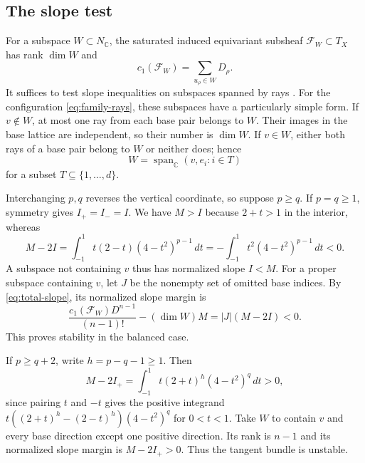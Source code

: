\documentclass[11pt]{amsart}
\theoremstyle{definition}
\theoremstyle{remark}
\newcommand{\CC}{\mathbb C}
\newcommand{\Span}{\operatorname{span}}
\begin{document}
\subsection{The slope test}
For a subspace $W\subset N_\CC$, the saturated induced equivariant
subsheaf $\mathcal F_W\subset T_X$ has rank $\dim W$ and
\begin{equation}\label{eq:toric-c1}
 c_1(\mathcal F_W)=\sum_{u_\rho\in W}D_\rho.
\end{equation}
It suffices to test slope inequalities on subspaces spanned by rays
\cite[Proposition~1.2 and Remark~2.6]{HNS}. For the configuration
\eqref{eq:family-rays}, these subspaces have a particularly simple form.
If $v\notin W$, at most one ray from each base pair belongs to $W$.
Their images in the base lattice are independent, so their number is
$\dim W$. If $v\in W$, either both rays of a base pair belong to $W$
or neither does; hence
\begin{equation}\label{eq:vertical-flat}
 W=\Span_\CC(v,e_i:i\in T)
\end{equation}
for a subset $T\subseteq\{1,\ldots,d\}$.

Interchanging $p,q$ reverses the vertical coordinate, so suppose $p\ge q$.
If $p=q\ge1$, symmetry gives $I_+=I_-=I$. We have $M>I$ because
$2+t>1$ in the interior, whereas
\[
 M-2I=\int_{-1}^1t(2-t)(4-t^2)^{p-1}\,dt
      =-\int_{-1}^1t^2(4-t^2)^{p-1}\,dt<0.
\]
A subspace not containing $v$ thus has normalized slope $I<M$.
For a proper subspace containing $v$, let $J$ be the nonempty set of
omitted base indices. By \eqref{eq:total-slope}, its normalized slope
margin is
\[
 \frac{c_1(\mathcal F_W)D^{n-1}}{(n-1)!}-(\dim W)M
       =|J|(M-2I)<0.
\]
This proves stability in the balanced case.

If $p\ge q+2$, write $h=p-q-1\ge1$. Then
\[
 M-2I_+=\int_{-1}^1t(2+t)^h(4-t^2)^q\,dt>0,
\]
since pairing $t$ and $-t$ gives the positive integrand
$t((2+t)^h-(2-t)^h)(4-t^2)^q$ for $0<t<1$.
Take $W$ to contain $v$ and every base direction except one positive
direction. Its rank is $n-1$ and its normalized slope margin is
$M-2I_+>0$. Thus the tangent bundle is unstable.
\end{document}
